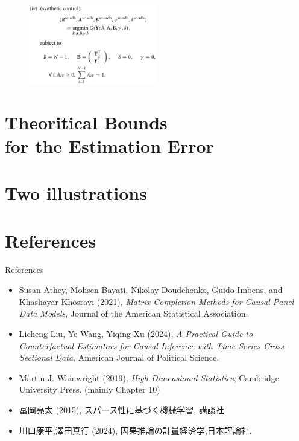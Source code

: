 \documentclass[xcolor=svgnames,aspectratio=169]{beamer}
\begin{document}
\begin{frame}
    \begin{figure}
            \includegraphics[width=0.5\textwidth, height=0.5\textheight, keepaspectratio]{SC.png}
    \end{figure}
\end{frame}

\section{Theoritical Bounds \\ for the Estimation Error}

\section{Two illustrations}

\section{References}

\begin{frame}{References}
    \begin{itemize}
        \item Susan Athey, Mohsen Bayati, Nikolay Doudchenko, Guido Imbens, and Khashayar Khosravi (2021), \textit{Matrix Completion Methods for Causal Panel Data Models}, Journal of the American Statistical Association.
        \item Licheng Liu, Ye Wang, Yiqing Xu (2024), \textit{A Practical Guide to Counterfactual Estimators for Causal Inference with Time-Series Cross-Sectional Data},  American Journal of Political Science.
        \item Martin J. Wainwright (2019), \textit{High-Dimensional Statistics}, Cambridge University Press. (mainly Chapter 10)
        \item 冨岡亮太 (2015), スパース性に基づく機械学習, 講談社.
        \item 川口康平,澤田真行 (2024), 因果推論の計量経済学,日本評論社.
    \end{itemize}
\end{frame}
\end{document}
